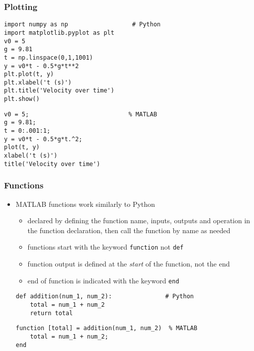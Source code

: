 \documentclass[english,14pt]{beamer}
\begin{document}

\begin{frame}[fragile]

\frametitle{Plotting}

\begin{lstlisting}[style=CStyle]
import numpy as np                  # Python
import matplotlib.pyplot as plt
v0 = 5
g = 9.81
t = np.linspace(0,1,1001) 
y = v0*t - 0.5*g*t**2
plt.plot(t, y)
plt.xlabel('t (s)')
plt.title('Velocity over time')
plt.show()
\end{lstlisting}
\begin{lstlisting}[style=MStyle]
v0 = 5;                            % MATLAB
g = 9.81;
t = 0:.001:1;   
y = v0*t - 0.5*g*t.^2;
plot(t, y)
xlabel('t (s)')
title('Velocity over time')
\end{lstlisting}
\end{frame}


\begin{frame}[fragile]

\frametitle{Functions}

\begin{itemize}
	\item MATLAB functions work similarly to Python
	\begin{itemize}
		\item declared by defining the function name, inputs, outputs and operation in the function declaration, then call the function by name as needed

	\item functions start with the keyword \texttt{function} not \texttt{def}
	\item function output is defined at the \emph{start} of the function, not the end
	\item end of function is indicated with the keyword \texttt{end}
	\end{itemize}
\begin{lstlisting}[style=CStyle]
def addition(num_1, num_2):               # Python
    total = num_1 + num_2
    return total
\end{lstlisting}
\begin{lstlisting}[style=MStyle]
function [total] = addition(num_1, num_2)  % MATLAB
    total = num_1 + num_2;
end
\end{lstlisting}
\end{itemize}
\end{frame}
\end{document}

